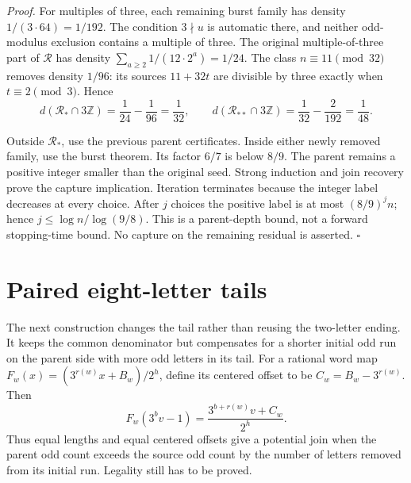 \documentclass[11pt,letterpaper]{article}
\newcommand{\Z}{\mathbb{Z}}
\newenvironment{proof}{\noindent\textit{Proof.}}{\hfill\(\square\)}
\begin{document}
\begin{proof}
For multiples of three, each remaining burst family has density
\(1/(3\cdot64)=1/192\). The condition \(3\nmid u\) is automatic there,
and neither odd-modulus exclusion contains a multiple of three.
The original multiple-of-three part of \(\mathcal R\) has density
\(\sum_{a\ge2}1/(12\cdot2^a)=1/24\).
The class \(n\equiv11\pmod{32}\) removes density \(1/96\):
its sources \(11+32t\) are divisible by three exactly when
\(t\equiv2\pmod3\). Hence
\[
d(\mathcal R_*\cap3\Z)=\frac1{24}-\frac1{96}=\frac1{32},\qquad
d(\mathcal R_{**}\cap3\Z)=\frac1{32}-\frac2{192}=\frac1{48}.
\]

Outside \(\mathcal R_*\), use the previous parent certificates.
Inside either newly removed family, use the burst theorem.
Its factor \(6/7\) is below \(8/9\).
The parent remains a positive integer smaller than the original seed.
Strong induction and join recovery prove the capture implication.
Iteration terminates because the integer label decreases at every choice.
After \(j\) choices the positive label is at most \((8/9)^j n\);
hence \(j\le\log n/\log(9/8)\).
This is a parent-depth bound, not a forward stopping-time bound.
No capture on the remaining residual is asserted.
\end{proof}

\section{Paired eight-letter tails}

The next construction changes the tail rather than reusing the two-letter
ending. It keeps the common denominator but compensates for a shorter
initial odd run on the parent side with more odd letters in its tail.
For a rational word map \(F_w(x)=(3^{r(w)}x+B_w)/2^h\), define its
centered offset to be \(C_w=B_w-3^{r(w)}\). Then
\[
F_w(3^b v-1)=\frac{3^{b+r(w)}v+C_w}{2^h}.
\]
Thus equal lengths and equal centered offsets give a potential join
when the parent odd count exceeds the source odd count by the number
of letters removed from its initial run. Legality still has to be proved.
\end{document}
